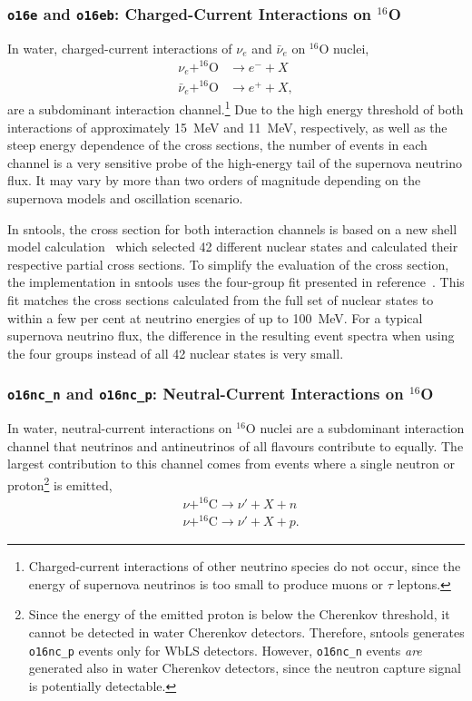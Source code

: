 \documentclass[11pt, oneside]{article}
\newcommand{\nue}{\ensuremath{\nu_e}\xspace}
\newcommand{\nuebar}{\ensuremath{\bar{\nu}_e}\xspace}
\begin{document}
\subsubsection{\texttt{o16e} and \texttt{o16eb}: Charged-Current Interactions on $^{16}$O}
In water, charged-current interactions of \nue and \nuebar on $^{16}$O nuclei,
\begin{align}
\nue + ^{16}\text{O} &\rightarrow e^- + X \\
\nuebar + ^{16}\text{O} &\rightarrow e^+ + X,
\end{align}
are a subdominant interaction channel.\footnote{\label{fn:cc-interactions}Charged-current interactions of other neutrino species do not occur, since the energy of supernova neutrinos is too small to produce muons or $\tau$ leptons.}
Due to the high energy threshold of both interactions of approximately \SI{15}{MeV} and \SI{11}{MeV}, respectively, as well as the steep energy dependence of the cross sections, the number of events in each channel is a very sensitive probe of the high-energy tail of the supernova neutrino flux.
It may vary by more than two orders of magnitude depending on the supernova models and oscillation scenario.

In sntools, the cross section for both interaction channels is based on a new shell model calculation~\cite{Suzuki2018} which selected 42 different nuclear states and calculated their respective partial cross sections.
To simplify the evaluation of the cross section, the implementation in sntools uses the four-group fit presented in reference~\cite{Nakazato2018}.
This fit matches the cross sections calculated from the full set of nuclear states to within a few per cent at neutrino energies of up to \SI{100}{MeV}.
For a typical supernova neutrino flux, the difference in the resulting event spectra when using the four groups instead of all 42 nuclear states is very small.


\subsubsection{\texttt{o16nc\_n} and \texttt{o16nc\_p}: Neutral-Current Interactions on $^{16}$O}
In water, neutral-current interactions on $^{16}$O nuclei are a subdominant interaction channel that neutrinos and antineutrinos of all flavours contribute to equally.
The largest contribution to this channel comes from events where a single neutron or proton\footnote{
	Since the energy of the emitted proton is below the Cherenkov threshold, it cannot be detected in water Cherenkov detectors.
	Therefore, sntools generates \texttt{o16nc\_p} events only for WbLS detectors.
	However, \texttt{o16nc\_n} events \textit{are} generated also in water Cherenkov detectors, since the neutron capture signal is potentially detectable.
} is emitted,
\begin{align}
&\nu + ^{16}\text{C} \rightarrow \nu' + X + n\\
&\nu + ^{16}\text{C} \rightarrow \nu' + X + p.
\end{align}
\end{document}
